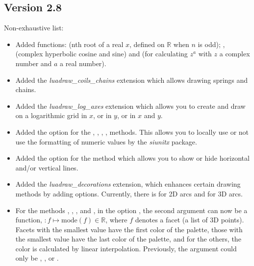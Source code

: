 \subsection{Version 2.8}
Non-exhaustive list:
\begin{itemize}
    \item Added functions:  (nth root of a real $x$, defined on $\mathbb R$ when $n$ is odd); ,  (complex hyperbolic cosine and sine) and  (for calculating $z^a$ with $z$ a complex number and $a$ a real number).
    
    \item Added the \emph{luadraw\_coils\_chains} extension which allows drawing springs and chains.
    
    \item Added the \emph{luadraw\_log\_axes} extension which allows you to create and draw on a logarithmic grid in $x$, or in $y$, or in $x$ and $y$.
    
    \item Added the  option for the , , , ,  methods. This allows you to locally use or not use the formatting of numeric values ​​by the \emph{siunitx} package.
    
    \item Added the  option for the  method which allows you to show or hide horizontal and/or vertical lines.
    
    \item Added the \emph{luadraw\_decorations} extension, which enhances certain drawing methods by adding options. Currently, there is  for 2D arcs and  for 3D arcs.
    
    \item For the methods , , , and , in the option , the second argument can now be a function, $\colon f \mapsto \mathrm{mode}(f)\in\mathbb R$, where $f$ denotes a facet (a list of 3D points). Facets with the smallest value have the first color of the palette, those with the smallest value have the last color of the palette, and for the others, the color is calculated by linear interpolation. Previously, the argument  could only be , , or .
    

\end{itemize}
